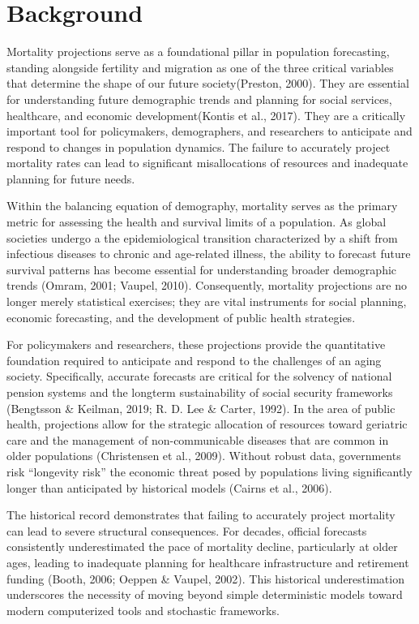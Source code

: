 \documentclass[
  12pt,
]{report}
\begin{document}
\section{Background}\label{background}

Mortality projections serve as a foundational pillar in population
forecasting, standing alongside fertility and migration as one of the
three critical variables that determine the shape of our future
society(Preston, 2000). They are essential for understanding future
demographic trends and planning for social services, healthcare, and
economic development(Kontis et al., 2017). They are a critically
important tool for policymakers, demographers, and researchers to
anticipate and respond to changes in population dynamics. The failure to
accurately project mortality rates can lead to significant
misallocations of resources and inadequate planning for future needs.

Within the balancing equation of demography, mortality serves as the
primary metric for assessing the health and survival limits of a
population. As global societies undergo a the epidemiological transition
characterized by a shift from infectious diseases to chronic and
age-related illness, the ability to forecast future survival patterns
has become essential for understanding broader demographic trends
(Omram, 2001; Vaupel, 2010). Consequently, mortality projections are no
longer merely statistical exercises; they are vital instruments for
social planning, economic forecasting, and the development of public
health strategies.

For policymakers and researchers, these projections provide the
quantitative foundation required to anticipate and respond to the
challenges of an aging society. Specifically, accurate forecasts are
critical for the solvency of national pension systems and the longterm
sustainability of social security frameworks (Bengtsson \& Keilman,
2019; R. D. Lee \& Carter, 1992). In the area of public health,
projections allow for the strategic allocation of resources toward
geriatric care and the management of non-communicable diseases that are
common in older populations (Christensen et al., 2009). Without robust
data, governments risk ``longevity risk'' the economic threat posed by
populations living significantly longer than anticipated by historical
models (Cairns et al., 2006).

The historical record demonstrates that failing to accurately project
mortality can lead to severe structural consequences. For decades,
official forecasts consistently underestimated the pace of mortality
decline, particularly at older ages, leading to inadequate planning for
healthcare infrastructure and retirement funding (Booth, 2006; Oeppen \&
Vaupel, 2002). This historical underestimation underscores the necessity
of moving beyond simple deterministic models toward modern computerized
tools and stochastic frameworks.
\end{document}
